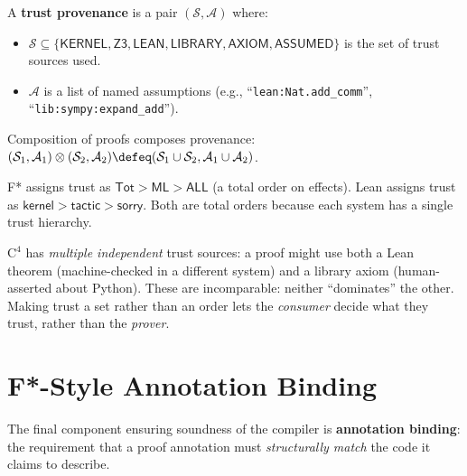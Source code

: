 \begin{definition}
\label{def:trust-provenance}
A \textbf{trust provenance} is a pair $(\mathcal{S}, \mathcal{A})$
where:
\begin{itemize}
\item $\mathcal{S} \subseteq \{\mathsf{KERNEL}, \mathsf{Z3},
  \mathsf{LEAN}, \mathsf{LIBRARY}, \mathsf{AXIOM},
  \mathsf{ASSUMED}\}$ is the set of trust sources used.
\item $\mathcal{A}$ is a list of named assumptions (e.g.,
  ``\texttt{lean:Nat.add\_comm}'',
  ``\texttt{lib:sympy:expand\_add}'').
\end{itemize}
Composition of proofs composes provenance:
$(\mathcal{S}_1, \mathcal{A}_1) \otimes (\mathcal{S}_2, \mathcal{A}_2)
\defeq (\mathcal{S}_1 \cup \mathcal{S}_2,
\mathcal{A}_1 \cup \mathcal{A}_2)$.
\end{definition}

\begin{remark}
F* assigns trust as $\mathsf{Tot} > \mathsf{ML} > \mathsf{ALL}$
(a total order on effects).  Lean assigns trust as
$\mathsf{kernel} > \mathsf{tactic} > \mathsf{sorry}$.  Both are
total orders because each system has a single trust hierarchy.

$\mathrm{C}^4$ has \emph{multiple independent} trust sources:
a proof might use both a Lean theorem (machine-checked in a
different system) and a library axiom (human-asserted about
Python).  These are incomparable: neither ``dominates'' the other.
Making trust a set rather than an order lets the \emph{consumer}
decide what they trust, rather than the \emph{prover}.
\end{remark}


\section{F*-Style Annotation Binding}
\label{sec:binding}

The final component ensuring soundness of the compiler is
\textbf{annotation binding}: the requirement that a proof
annotation must \emph{structurally match} the code it claims
to describe.

